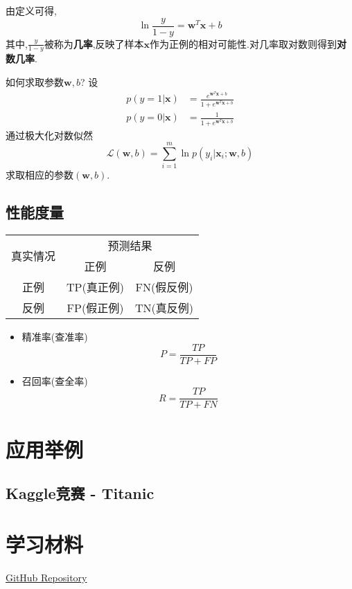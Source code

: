 \documentclass{beamer}
\begin{document}
    \begin{frame}
        由定义可得,$$\ln\frac{y}{1-y}=\bm w^T\bm x+b$$
        其中,$\frac{y}{1-y}$被称为\textbf{几率},反映了样本$\bm x$作为正例的相对可能性.对几率取对数则得到\textbf{对数几率}.

        如何求取参数$\bm w,b$?
    设\begin{equation*}\begin{split}
    p(y=1|\bm x)&=\frac{e^{\bm w^T\bm x+b}}{1+e^{\bm w^T\bm x+b}}\\
    p(y=0|\bm x)&=\frac{1}{1+e^{\bm w^T\bm x+b}}
    \end{split}\end{equation*}
    通过极大化对数似然$$\mathcal L(\bm w,b)=\sum_{i=1}^m\ln p(y_i|\bm x_i;\bm w,b)$$求取相应的参数$(\bm w,b)$.
    \end{frame}

    \subsection{性能度量}
    \begin{frame}
        \begin{center}\begin{tabular}{|c|c|c|}
            \hline
            \multirow{2}{*}{真实情况} &
            \multicolumn{2}{c|}{预测结果}\\
            \cline{2-3}
              & 正例 & 反例 \\
            \hline
            正例 & TP(真正例) & FN(假反例) \\
            \hline
            反例 & FP(假正例) & TN(真反例) \\
            \hline
            \end{tabular}\end{center}
        \begin{itemize}
            \item 精准率(查准率)$$P=\frac{TP}{TP+FP}$$
            \item 召回率(查全率)$$R=\frac{TP}{TP+FN}$$
        \end{itemize}
    \end{frame}

\section{应用举例}
    \subsection{Kaggle竞赛 - Titanic}
    \begin{frame}
    \end{frame}

\section{学习材料}
    \begin{frame}
        \href{https://github.com/ShuaiHuang/Machine-Learning-Material}{GitHub Repository}
    \end{frame}
\end{document}
